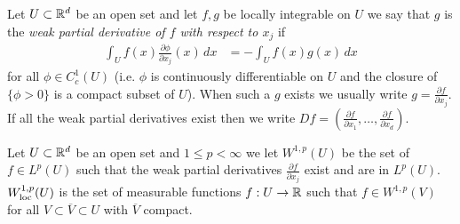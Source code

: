 \begin{defn}Let $U \subset \mathbb{R}^d$ be an open set and let $f, g$ be locally integrable on $U$ we say that $g$ is the
\emph{weak partial derivative of $f$ with respect to $x_j$} if 
\begin{align*}
\int_U f(x) \frac{\partial \phi}{\partial x_j}(x) \, dx &= -\int_U f(x) g(x) \, dx
\end{align*}
for all $\phi \in C^1_c(U)$ (i.e. $\phi$ is continuously differentiable on $U$ and the closure of $\lbrace \phi > 0 \rbrace$ is a compact subset of
$U$).  When such a $g$ exists we usually write $g = \frac{\partial f}{\partial x_j}$.  If all the weak partial derivatives exist then we write
$Df = (\frac{\partial f}{\partial x_1}, \dotsc, \frac{\partial f}{\partial x_d})$.
\end{defn}

\begin{defn}Let $U \subset \mathbb{R}^d$ be an open set and $1 \leq p < \infty$ we let $W^{1,p}(U)$ be the set of $f \in L^p(U)$ such that 
the weak partial derivatives $\frac{\partial f}{\partial x_j}$ exist and are in $L^p(U)$.  $W^{1,p}_{\operatorname*{loc}}(U)$ is the set of measurable functions $f : U \to \mathbb{R}$
such that $f \in W^{1,p}(V)$ for all $V \subset \overline{V} \subset U$ with $\overline{V}$ compact.
\end{defn}

